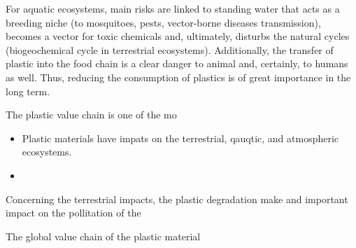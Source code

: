 \documentclass[]{elsarticle} %
\begin{document}
For aquatic ecosystems, main risks are linked to standing water that acts as a breeding niche (to mosquitoes, pests, vector-borne diseases transmission), becomes a vector for toxic chemicals and, ultimately, disturbs the natural cycles (biogeochemical cycle in terrestrial ecosystems). Additionally, the transfer of plastic into the food chain is a clear danger to animal and, certainly, to humans as well. Thus, reducing the consumption of plastics is of great importance in the long term.

The plastic value chain is one of the mo

\begin{itemize}
\item
  Plastic materials have impats on the terrestrial, qauqtic, and atmospheric ecosystems.
\item
\end{itemize}

Concerning the terrestrial impacts, the plastic degradation make and important impact on the pollitation of the

The global value chain of the plastic material

\renewcommand{\arraystretch}{1.5}
\end{document}
